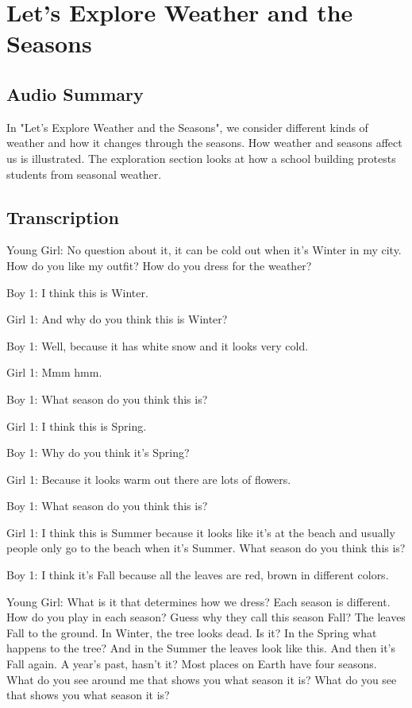 \section{Let's Explore Weather and the Seasons}

\subsection{Audio Summary}

In "Let's Explore Weather and the Seasons", we consider different kinds of weather and how it changes through the seasons. How weather and seasons affect us is illustrated. The exploration section looks at how a school building protests students from seasonal weather.

\subsection{Transcription}

Young Girl: No question about it, it can be cold out when it's Winter in my city. How do you like my outfit? How do you dress for the weather?

Boy 1: I think this is Winter.

Girl 1: And why do you think this is Winter?

Boy 1: Well, because it has white snow and it looks very cold.

Girl 1: Mmm hmm.

Boy 1: What season do you think this is?

Girl 1: I think this is Spring.

Boy 1: Why do you think it's Spring?

Girl 1: Because it looks warm out there are lots of flowers.

Boy 1: What season do you think this is?

Girl 1: I think this is Summer because it looks like it's at the beach and usually people only go to the beach when it's Summer. What season do you think this is?

Boy 1: I think it's Fall because all the leaves are red, brown in different colors.

Young Girl: What is it that determines how we dress? Each season is different. How do you play in each season? Guess why they call this season Fall? The leaves Fall to the ground. In Winter, the tree looks dead. Is it? In the Spring what happens to the tree? And in the Summer the leaves look like this. And then it's Fall again. A year's past, hasn't it? Most places on Earth have four seasons. What do you see around me that shows you what season it is? What do you see that shows you what season it is?

